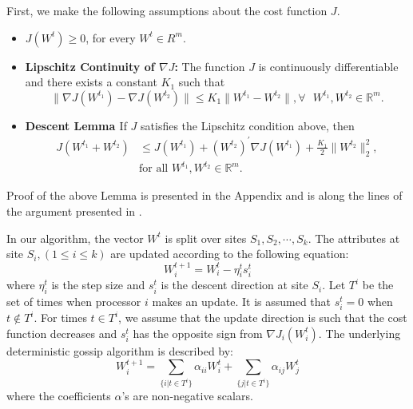 \noindent First, we make the following assumptions about the cost function $J$.
\begin{asm}{}
\begin{itemize}
\item $J(W^t) \ge 0$, for every $W^t \in R^m$.

\item \textbf{Lipschitz Continuity of $\nabla J$: } The function $J$ is continuously differentiable and there exists a constant $K_1$ such that 
\begin{equation}
\parallel \nabla J(W^{t_1}) - \nabla J(W^{t_2}) \parallel \le K_1 \parallel W^{t_1} - W^{t_2} \parallel, \forall \text{ } W^{t_1}, W^{t_2} \in \mathbb{R}^m.
\end{equation}

\item \textbf{Descent Lemma \cite{Bertsekas_97} } If $J$ satisfies the Lipschitz condition above, then
\begin{align*}
\label{desLips}
J(W^{t_1}+W^{t_2}) &\le J(W^{t_1}) + (W^{t_2})^{'} \nabla J(W^{t_1}) + \frac{K_1}{2} \parallel W^{t_2}\parallel_2^2,  \\
                    &\text{for all }W^{t_1}, W^{t_2} \in \mathbb{R}^m.
\end{align*}
\end{itemize}
\end{asm}
\noindent Proof of the above Lemma is presented in the Appendix and is along the lines of the argument presented in \cite{Bertsekas_97}.


\noindent In our algorithm, the vector $W^t$ is split over sites $S_1, S_2, \cdots, S_k$. The attributes at site $S_i, (1 \le i \le k) $ are updated according to the following equation:
\begin{equation}
W_i^{t+1} = W_i^t - \eta_i^t s_i^t
\end{equation} 
where $\eta_i^t$ is the step size and $s_i^t$ is the descent direction at site $S_i$. Let $T^i$ be the set of times when processor $i$ makes an update. It is assumed that $s_i^t=0$ when $t \notin T^i$. For times $t \in T^i$, we assume that the update direction is such that the cost function decreases and $s_i^t$ has the opposite sign from $\nabla J_i(W_i^{t})$. The underlying deterministic gossip algorithm is described by:
\begin{equation}
\label{gossip}
W_{i}^{t+1} = \sum_{\{i|t \in T^{i} \}} \alpha_{ii} W_{i}^{t} + \sum_{\{j|t \in T^{i} \}} \alpha_{ij} W_{j}^{t} \end{equation}
\noindent where the coefficients $\alpha$'s  are non-negative scalars.

